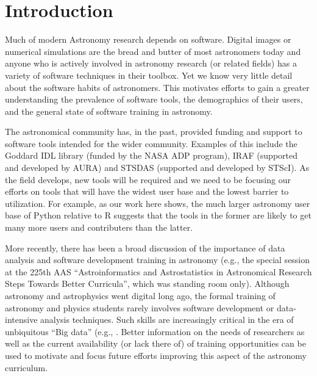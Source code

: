 \section{Introduction}
\label{sec:intro}

Much of modern Astronomy research depends on software. Digital images or numerical simulations are the bread and butter of most astronomers today and anyone who is actively involved in astronomy research (or related fields) has a variety of software techniques in their toolbox. Yet we know very little detail about the software habits of astronomers. This motivates efforts to gain a greater understanding the prevalence of software tools, the demographics of their users, and the general state of software training in astronomy.

The astronomical community has, in the past, provided funding and support to software tools intended for the wider community. Examples of this include the Goddard IDL library (funded by the NASA ADP program), IRAF (supported and developed by AURA) and STSDAS (supported and developed by STScI). As the field develops, new tools will be required and we need to be focusing our efforts on tools that will have the widest user base and the lowest barrier to utilization. For example, as our work here shows, the much larger astronomy user base of Python relative to R suggests that the tools in the former are likely to get many more users and contributers than the latter. 

More recently, there has been a broad discussion of the importance of data analysis and software development training in astronomy (e.g., the special session at the 225th AAS ``Astroinformatics and Astrostatistics in Astronomical Research Steps Towards Better Curricula'', which was standing room only). Although astronomy and astrophysics went digital long ago, the formal training of astronomy and physics students rarely involves software development or data-intensive analysis techniques. Such skills are increasingly critical in the era of unbiquitous ``Big data'' (e.g., \citep[e.g., ][, or the \href{http://www.noao.edu/meetings/bigdata/}{2015 NOAO Big Data conference}]{Berriman_2011}. Better information on the needs of researchers as well as the current availability (or lack there of) of training opportunities can be used to motivate and focus future efforts improving this aspect of the astronomy curriculum. 

